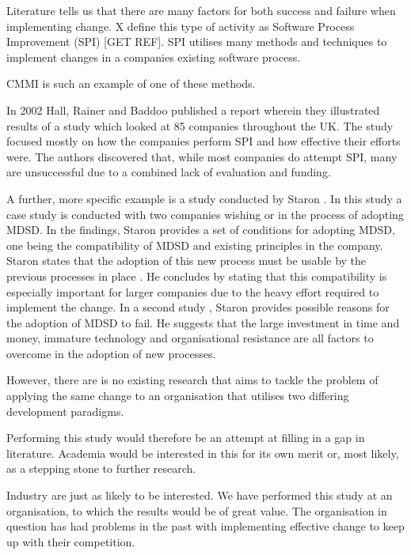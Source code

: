 \documentclass[times, 10pt,twocolumn]{IEEEtran}
\begin{document}
Literature tells us that there are many factors for both success and failure when implementing change. X define this type of activity as Software Process Improvement (SPI) [GET REF]. SPI utilises many methods and techniques to implement changes in a companies existing software process. 

CMMI is such an example of one of these methods.

In 2002 Hall, Rainer and Baddoo \cite{hall2002implementing} published a report wherein they illustrated results of a study which looked at 85 companies throughout the UK. The study focused mostly on how the companies perform SPI and how effective their efforts were. The authors discovered that, while most companies do attempt SPI, many are unsuccessful due to a combined lack of evaluation and funding.

A further, more specific example is a study conducted by Staron \cite{staron2006adopting}. In this study a case study is conducted with two companies wishing or in the process of adopting MDSD. In the findings, Staron provides a set of conditions for adopting MDSD, one being the compatibility of MDSD and existing principles in the company. Staron states that the adoption of this new process must be usable by the previous processes in place \cite{staron2006adopting}. He concludes by stating that this compatibility is especially important for larger companies due to the heavy effort required to implement the change. In a second study \cite{staron2008transitioning}, Staron provides possible reasons for the adoption of MDSD to fail. He suggests that the large investment in time and money, immature technology and organisational resistance are all factors to overcome in the adoption of new processes.

However, there are is no existing research that aims to tackle the problem of applying the same change to an organisation that utilises two differing development paradigms.

Performing this study would therefore be an attempt at filling in a gap in literature. Academia would be interested in this for its own merit or, most likely, as a stepping stone to further research.

Industry are just as likely to be interested. We have performed this study at an organisation, to which the results would be of great value. The organisation in question has had problems in the past with implementing effective change to keep up with their competition. 
\end{document}
